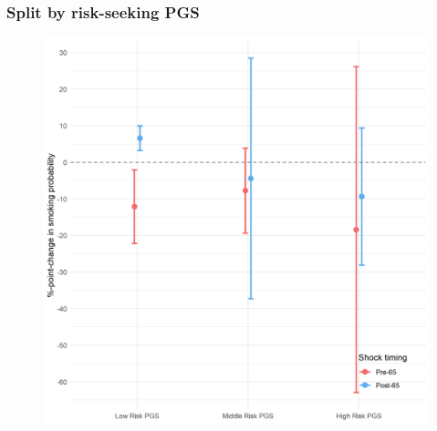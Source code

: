 \documentclass[10pt,compress,xcolor=dvipsnames,aspectratio=169]{beamer}    %
\newcounter{ex}
\newcommand{\1}[1]{\mathrm{1\hspace*{-2.5pt}l}[#1]}	%
\begin{document}
%
%
\begin{frame}
\frametitle{Split by risk-seeking PGS}

\begin{figure}[hbtp]
\centering
\includegraphics[height=0.8\textheight]{../../3_output/shock_effects/robustness_riskPGS_GWAS_6070_100_cv.png}
\label{fig:riskPGS}
\end{figure}
\hyperlink{frame:otherX}{}
\end{frame}

%
%
\end{document}
